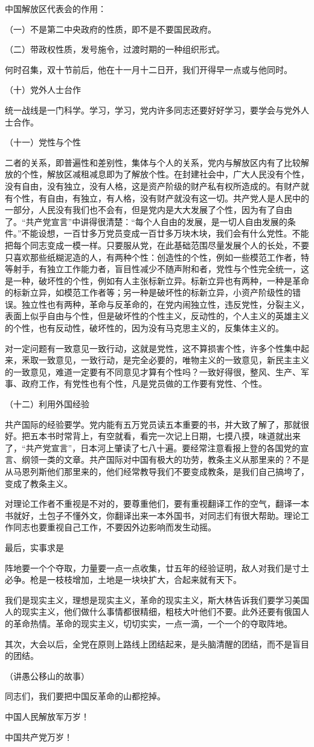 中国解放区代表会的作用：

（一）不是第二中央政府的性质，即不是不要国民政府。

（二）带政权性质，发号施令，过渡时期的一种组织形式。

何时召集，双十节前后，他在十一月十二日开，我们开得早一点或与他同时。

（十）党外人士台作

统一战线是一门科学。学习，学习，党内许多同志还要好好学习，要学会与党外人士合作。

（十一）党性与个性

二者的关系，即普遍性和差别性，集体与个人的关系，党内与解放区内有了比较解放的个性，解放区减租减息即为了解放个性。在封建社会中，广大人民没有个性，没有自由，没有独立，没有人格，这是资产阶级的财产私有权所造成的。有财产就有个性，有自由，有独立，有人格，没有财产就没有这一切。共产党人是人民中的一部分，人民没有我们也不会有，但是党内是大大发展了个性，因为有了自由了。“共产党宣言”中讲得很清楚：“每个人自由的发展，是一切人自由发展的条件。”不能设想，一百廿多万党员变成一百廿多万块木块，我们会有什么党性。不能把每个同志变成一模一样。只要服从党，在此基础范围尽量发展个人的长处，不要只喜欢那些纸糊泥造的人，有两种个性：创造性的个性，例如一些模范工作者，特等射手，有独立工作能力者，盲目性减少不随声附和者，党性与个性完全统一，这是一种，破坏性的个性，例如有人主张标新立异。标新立异也有两种，一种是革命的标新立异，如模范工作者等；另一种是破坏性的标新立异，小资产阶级性的错误。独立性也有两种，革命与反革命的，在党内闹独立性，违反党性，分裂主义，表面上似乎自由与个性，但是破坏性的个性主义，反动性的，个人主义的英雄主义的个性，也有反动性，破坏性的，因为没有马克思主义的，反集体主义的。

对一定问题有一致意见一致行动，这就是党性，这不算损害个性，许多个性集中起来，釆取一致意见，一致行动，是完全必要的，唯物主义的一致意见，新民主主义的一致意见，难道一定要有不同意见才算有个性吗？一致好得很，整风、生产、军事、政府工作，有党性也有个性，凡是党员做的工作要有党性、个性。

（十二）利用外国经验

共产国际的经验要学。党内能有五万党员读五本重要的书，并大致了解了，那就很好。把五本书时常背上，有空就看，看完一次记上日期，七摸八摸，味道就出来了，“共产党宣言”，日本河上肇读了七八十遍。要经常注意看报上登的各国党的宣言、纲领一类的文章。共产国际对中国有极大的功劳，教条主义从那里来的？不是从马恩列斯他们那里来的，他们经常教导我们不要变成教条，是我们自己搞垮了，变成了教条主义。

对理论工作者不重视是不对的，要尊重他们，要有重视翻译工作的空气，翻译一本书就好，土包子不懂外文，你翻译出来一本外国书，对同志们有很大帮助。理论工作同志也要重视自己工作，不要因外边影响而发生动摇。

最后，实事求是

阵地要一个个夺取，力量要一点一点收集，廿五年的经验证明，敌人对我们是寸土必争。枪是一枝枝增加，土地是一块块扩大，合起来就有天下。

我们是现实主义，理想是现实主义，革命的现实主义，斯大林告诉我们要学习美国人的现实主义，他们做什么事情都很精细，粗枝大叶他们不要。此外还要有俄国人的革命热情。革命的现实主义，切切实实，一点一滴，一个一个的夺取阵地。

其次，大会以后，全党在原则上路线上团结起来，是头脑清醒的团结，而不是盲目的团结。

（讲愚公移山的故事）

同志们，我们要把中国反革命的山都挖掉。

中国人民解放军万岁！

中国共产党万岁！

